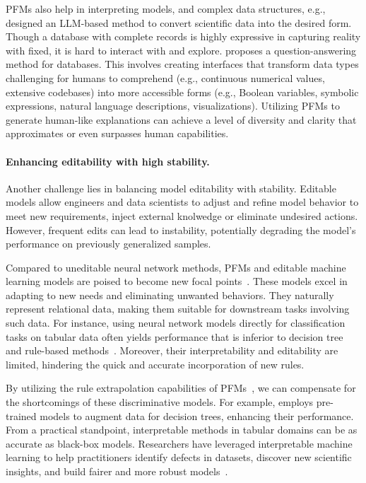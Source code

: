 PFMs also help in interpreting models, and complex data structures, e.g., \cite{ko2024filling} designed an LLM-based method to convert scientific data into the desired form. Though a database with complete records is highly expressive in capturing reality with fixed, it is hard to interact with and explore. \cite{zheng2024revolutionizing} proposes a question-answering method for databases. This involves creating interfaces that transform data types challenging for humans to comprehend (e.g., continuous numerical values, extensive codebases) into more accessible forms (e.g., Boolean variables, symbolic expressions, natural language descriptions, visualizations). Utilizing PFMs to generate human-like explanations can achieve a level of diversity and clarity that approximates or even surpasses human capabilities.

\paragraph{Enhancing editability with high stability.}

Another challenge lies in balancing model editability with stability. Editable models allow engineers and data scientists to adjust and refine model behavior to meet new requirements, inject external knolwedge or eliminate undesired actions. However, frequent edits can lead to instability, potentially degrading the model's performance on previously generalized samples.

Compared to uneditable neural network methods, PFMs and editable machine learning models are poised to become new focal points~\cite{vojivr2020editable}. These models excel in adapting to new needs and eliminating unwanted behaviors. They naturally represent relational data, making them suitable for downstream tasks involving such data. For instance, using neural network models directly for classification tasks on tabular data often yields performance that is inferior to decision tree and rule-based methods~\cite{popov2019neural,grinsztajn2022tree}. Moreover, their interpretability and editability are limited, hindering the quick and accurate incorporation of new rules.

By utilizing the rule extrapolation capabilities of PFMs~\cite{reizingerposition}, we can compensate for the shortcomings of these discriminative models. For example, \cite{nam2024optimized} employs pre-trained models to augment data for decision trees, enhancing their performance. From a practical standpoint, interpretable methods in tabular domains can be as accurate as black-box models. Researchers have leveraged interpretable machine learning to help practitioners identify defects in datasets, discover new scientific insights, and build fairer and more robust models~\cite{caruana2022data}.

